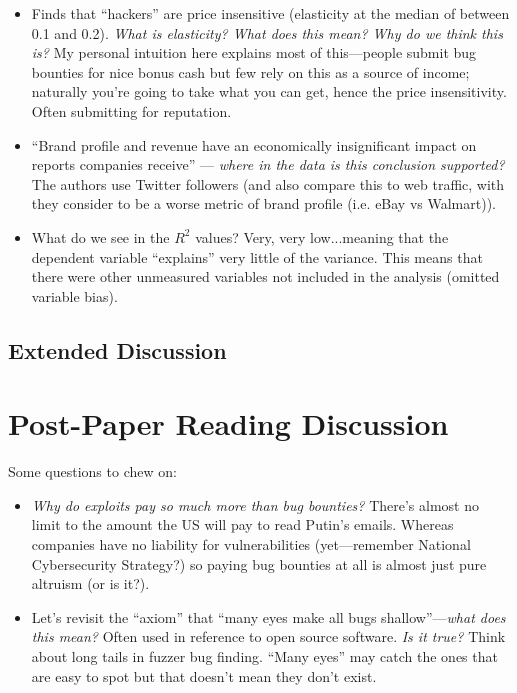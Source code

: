 \documentclass[11pt]{article}
\begin{document}
\begin{itemize}
    \item Finds that ``hackers'' are price insensitive (elasticity at the median of between 0.1 and 0.2). {\it What is elasticity? What does this mean? Why do we think this is?} My personal intuition here explains most of this---people submit bug bounties for nice bonus cash but few rely on this as a source of income; naturally you're going to take what you can get, hence the price insensitivity. Often submitting for reputation.
    \item ``Brand profile and revenue have an economically insignificant impact on reports companies receive'' --- {\it where in the data is this conclusion supported?} The authors use Twitter followers (and also compare this to web traffic, with they consider to be a worse metric of brand profile (i.e. eBay vs Walmart)).
    \item What do we see in the $R^2$ values? Very, very low...meaning that the dependent variable ``explains'' very little of the variance. This means that there were other unmeasured variables not included in the analysis (omitted variable bias).
\end{itemize}


\subsection{Extended Discussion} 

\section{Post-Paper Reading Discussion} 

Some questions to chew on:
\begin{itemize}
    \item {\it Why do exploits pay so much more than bug bounties?} There's almost no limit to the amount the US will pay to read Putin's emails. Whereas companies have no liability for vulnerabilities (yet---remember National Cybersecurity Strategy?) so paying bug bounties at all is almost just pure altruism (or is it?).
    \item Let's revisit the ``axiom'' that ``many eyes make all bugs shallow''---{\it what does this mean?} Often used in reference to open source software. {\it Is it true?} Think about long tails in fuzzer bug finding. ``Many eyes'' may catch the ones that are easy to spot but that doesn't mean they don't exist. 
\end{itemize}
\end{document}
